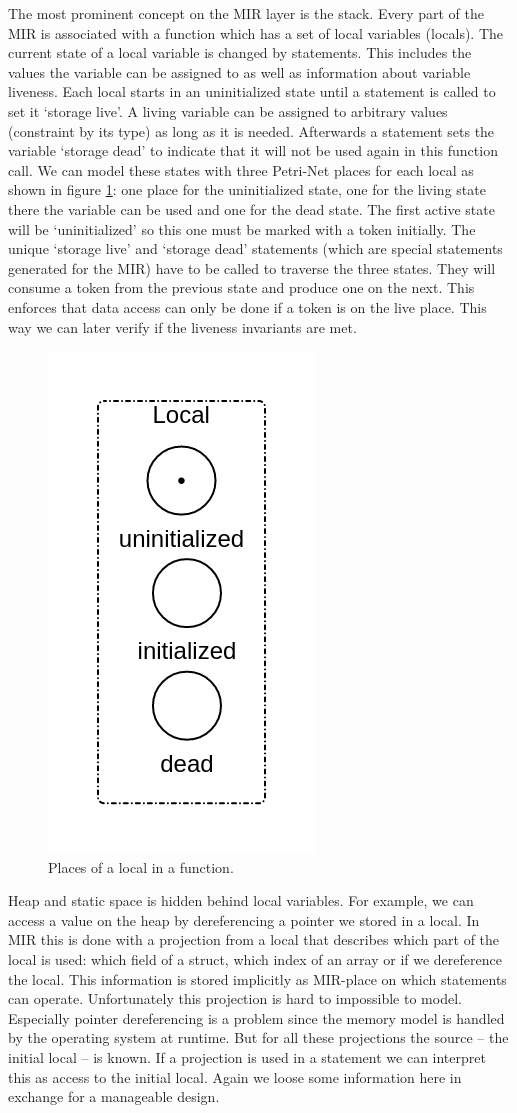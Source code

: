 The most prominent concept on the MIR layer is the stack.
Every part of the MIR is associated with a function which has a set of local variables (locals).
The current state of a local variable is changed by statements.
This includes the values the variable can be assigned to as well as information about variable liveness.
Each local starts in an uninitialized state until a statement is called to set it `storage live'.
A living variable can be assigned to arbitrary values (constraint by its type) as long as it is needed.
Afterwards a statement sets the variable `storage dead' to indicate that it will not be used again in this function call.
We can model these states with three Petri-Net places for each local as shown in figure \ref{local}: one place for the uninitialized state, one for the living state there the variable can be used and one for the dead state.
The first active state will be `uninitialized' so this one must be marked with a token initially.
The unique `storage live' and `storage dead' statements (which are special statements generated for the MIR) have to be called to traverse the three states.
They will consume a token from the previous state and produce one on the next.
This enforces that data access can only be done if a token is on the live place.
This way we can later verify if the liveness invariants are met.
\begin{figure}
    \centering
    \includegraphics[width=.2\textwidth]{../diagrams/local.png}
    \caption{Places of a local in a function.}
    \label{local}
\end{figure}

Heap and static space is hidden behind local variables.
For example, we can access a value on the heap by dereferencing a pointer we stored in a local.
In MIR this is done with a projection from a local that describes which part of the local is used:
which field of a struct, which index of an array or if we dereference the local.
This information is stored implicitly as MIR-place on which statements can operate.
Unfortunately this projection is hard to impossible to model.
Especially pointer dereferencing is a problem since the memory model is handled by the operating system at runtime.
But for all these projections the source -- the initial local -- is known.
If a projection is used in a statement we can interpret this as access to the initial local.
Again we loose some information here in exchange for a manageable design.


